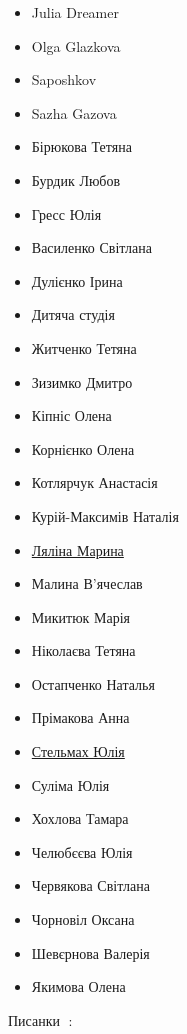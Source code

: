 \begin{itemize}
  \item Julia Dreamer
  \item Olga Glazkova
  \item Saposhkov
  \item Sazha Gazova
  \item Бірюкова Тетяна
  \item Бурдик Любов
  \item Гресс Юлія
  \item Василенко Світлана
  \item Дулієнко Ірина
  \item Дитяча студія
  \item Житченко Тетяна
  \item Зизимко Дмитро
  \item Кіпніс Олена
  \item Корнієнко Олена
  \item Котлярчук Анастасія
  \item Курій-Максимів Наталія
  \item \href{https://www.facebook.com/lialimaart}{Ляліна Марина}
  \item Малина В'ячеслав
  \item Микитюк Марія
  \item Ніколаєва Тетяна
  \item Остапченко Наталья
  \item Прімакова Анна
  \item \href{https://www.facebook.com/monaliza.life}{Стельмах Юлія}
  \item Суліма Юлія
  \item Хохлова Тамара
  \item Челюбєєва Юлія
  \item Червякова Світлана
  \item Чорновіл Оксана
  \item Шевєрнова Валерія
  \item Якимова Олена
\end{itemize}

Писанки 🥚:

